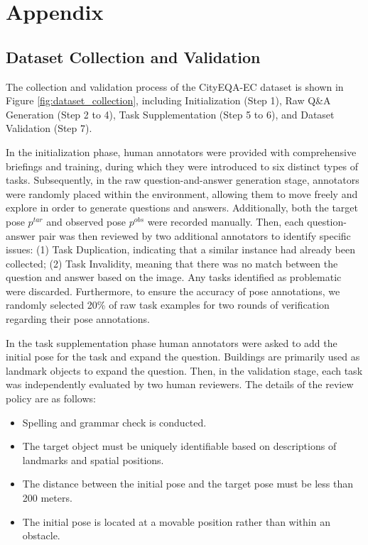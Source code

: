 \appendix
\section{Appendix}

\subsection{Dataset Collection and Validation}
\label{a_data_collection}
The collection and validation process of the CityEQA-EC dataset is shown in Figure \ref{fig:dataset_collection}, including Initialization (Step 1), Raw Q\&A Generation (Step 2 to 4), Task Supplementation (Step 5 to 6), and Dataset Validation (Step 7).

In the initialization phase, human annotators were provided with comprehensive briefings and training, during which they were introduced to six distinct types of tasks. Subsequently, in the raw question-and-answer generation stage, annotators were randomly placed within the environment, allowing them to move freely and explore in order to generate questions and answers. Additionally, both the target pose ${p^{tar}}$ and observed pose ${p^{obs}}$ were recorded manually. Then, each question-answer pair was then reviewed by two additional annotators to identify specific issues: (1) Task Duplication, indicating that a similar instance had already been collected; (2) Task Invalidity, meaning that there was no match between the question and answer based on the image. Any tasks identified as problematic were discarded. Furthermore, to ensure the accuracy of pose annotations, we randomly selected 20\% of raw task examples for two rounds of verification regarding their pose annotations.

In the task supplementation phase human annotators were asked to add the initial pose for the task and expand the question.  Buildings are primarily used as landmark objects to expand the question. Then, in the validation stage, each task was independently evaluated by two human reviewers. The details of the review policy are as follows:

\begin{itemize}
    \item Spelling and grammar check is conducted.
    
    \item The target object must be uniquely identifiable based on descriptions of landmarks and spatial positions.
    
    \item The distance between the initial pose and the target pose must be less than 200 meters.
    
    \item The initial pose is located at a movable position rather than within an obstacle.

    
\end{itemize}

